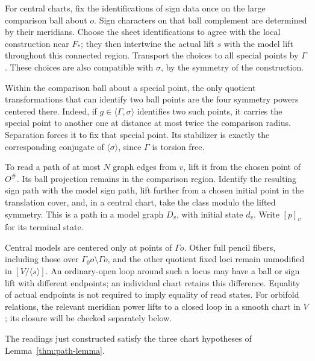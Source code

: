 For central charts, fix the identifications of sign data once on the
large comparison ball about $o$.  Sign characters on that ball
complement are determined by their meridians.  Choose the sheet
identifications to agree with the local construction near $F_*$;
they then intertwine the actual lift $s$ with the model lift
throughout this connected region.  Transport the choices to all
special points by $\Gamma$.  These choices are also compatible with
$\sigma$, by the symmetry of the construction.

Within the comparison ball about a special point, the only quotient
transformations that can identify two ball points are the four
symmetry powers centered there.  Indeed, if $g\in\langle\Gamma,
\sigma\rangle$ identifies two such points, it carries the special
point to another one at distance at most twice the comparison radius.
Separation forces it to fix that special point.  Its stabilizer is
exactly the corresponding conjugate of $\langle\sigma\rangle$,
since $\Gamma$ is torsion free.

To read a path of at most $N$ graph edges from $v$, lift it from the
chosen point of $O^\#$.  Its ball projection remains in the comparison
region.  Identify the resulting sign path with the model sign path,
lift further from a chosen initial point in the translation cover,
and, in a central chart, take the class modulo the lifted symmetry.
This is a path in a model graph $D_v$, with initial state $d_v$.
Write $[p]_v$ for its terminal state.

Central models are centered only at points of $\Gamma o$.  Other
full pencil fibers, including those over
$\Gamma_0o\setminus\Gamma o$, and the other quotient fixed loci
remain unmodified in $[V/\langle s\rangle]$.  An ordinary-open loop around such a locus may have a ball or
sign lift with different endpoints; an individual chart retains this
difference.  Equality of actual endpoints is not required to imply
equality of read states.  For orbifold relations, the relevant
meridian power lifts to a closed loop in a smooth chart in $V$;
its closure will be checked separately below.

\begin{lemma}\label{app:chart-axioms}
The readings just constructed satisfy the three chart hypotheses of
Lemma~\ref{thm:path-lemma}.
\end{lemma}

